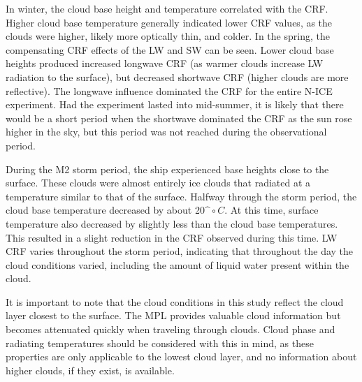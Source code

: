 In winter, the cloud base height and temperature correlated with the CRF. Higher cloud base temperature generally indicated lower CRF values, as the clouds were higher, likely more optically thin, and colder. In the spring, the compensating CRF effects of the LW and SW can be seen. Lower cloud base heights produced increased longwave CRF (as warmer clouds increase LW radiation to the surface), but decreased shortwave CRF (higher clouds are more reflective). The longwave influence dominated the CRF for the entire N-ICE experiment. Had the experiment lasted into mid-summer, it is likely that there would be a short period when the shortwave dominated the CRF as the sun rose higher in the sky, but this period was not reached during the observational period.

During the M2 storm period, the ship experienced base heights close to the surface.  These clouds were almost entirely ice clouds that radiated at a temperature similar to that of the surface. Halfway through the storm period, the cloud base temperature decreased by about 20$\^{\circ}C$. At this time, surface temperature also decreased by slightly less than the cloud base temperatures. This resulted in a slight reduction in the CRF observed during this time. LW CRF varies throughout the storm period, indicating that throughout the day the cloud conditions varied, including the amount of liquid water present within the cloud.

It is important to note that the cloud conditions in this study reflect the cloud layer closest to the surface. The MPL provides valuable cloud information but becomes attenuated quickly when traveling through clouds. Cloud phase and radiating temperatures should be considered with this in mind, as these properties are only applicable to the lowest cloud layer, and no information about higher clouds, if they exist, is available. 